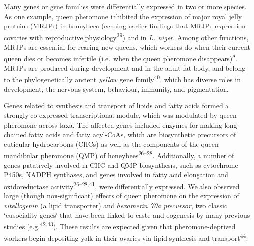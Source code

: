 \documentclass[12pt,]{article}
\begin{document}
Many genes or gene families were differentially expressed in two or more
species. As one example, queen pheromone inhibited the expression of
major royal jelly proteins (MRJPs) in honeybees (echoing earlier
findings that MRJPs expression covaries with reproductive
physiology\textsuperscript{39}) and in \emph{L. niger}. Among other
functions, MRJPs are essential for rearing new queens, which workers do
when their current queen dies or becomes infertile (i.e.~when the queen
pheromone disappears)\textsuperscript{8}. MRJPs are produced during
development and in the adult fat body, and belong to the
phylogenetically ancient \emph{yellow} gene family\textsuperscript{40},
which has diverse roles in development, the nervous system, behaviour,
immunity, and pigmentation.

Genes related to synthesis and transport of lipids and fatty acids
formed a strongly co-expressed transcriptional module, which was
modulated by queen pheromone across taxa. The affected genes included
enzymes for making long-chained fatty acids and fatty acyl-CoAs, which
are biosynthetic precursors of cuticular hydrocarbons (CHCs) as well as
the components of the queen mandibular pheromone (QMP) of
honeybees\textsuperscript{26--28}. Additionally, a number of genes
putatively involved in CHC and QMP biosynthesis, such as cytochrome
P450s, NADPH synthases, and genes involved in fatty acid elongation and
oxidoreductase activity\textsuperscript{26--28,41}, were differentially
expressed. We also observed large (though non-significant) effects of
queen pheromone on the expression of \emph{vitellogenin} (a lipid
transporter) and \emph{hexamerin 70a precursor}, two classic
`eusociality genes' that have been linked to caste and oogenesis by many
previous studies (e.g.\textsuperscript{42,43}). These results are
expected given that pheromone-deprived workers begin depositing yolk in
their ovaries via lipid synthesis and transport\textsuperscript{44}.
\end{document}
